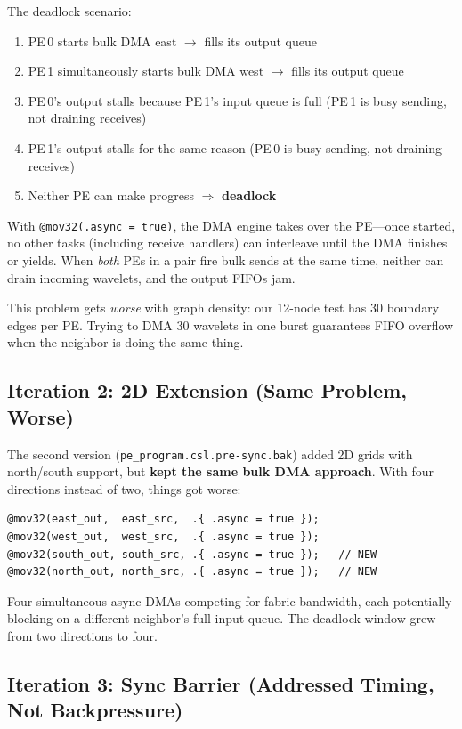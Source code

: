 \documentclass[11pt,letterpaper]{article}
\begin{document}
The deadlock scenario:
\begin{enumerate}[nosep]
  \item PE\,0 starts bulk DMA east $\to$ fills its output queue
  \item PE\,1 simultaneously starts bulk DMA west $\to$ fills its output queue
  \item PE\,0's output stalls because PE\,1's input queue is full (PE\,1 is busy sending, not draining receives)
  \item PE\,1's output stalls for the same reason (PE\,0 is busy sending, not draining receives)
  \item Neither PE can make progress $\Longrightarrow$ \textbf{deadlock}
\end{enumerate}

With \texttt{@mov32(.async = true)}, the DMA engine takes over the PE---once started, no other tasks (including receive handlers) can interleave until the DMA finishes or yields. When \emph{both} PEs in a pair fire bulk sends at the same time, neither can drain incoming wavelets, and the output FIFOs jam.

This problem gets \emph{worse} with graph density: our 12-node test has 30 boundary edges per PE. Trying to DMA 30 wavelets in one burst guarantees FIFO overflow when the neighbor is doing the same thing.

\subsection{Iteration 2: 2D Extension (Same Problem, Worse)}

The second version (\texttt{pe\_program.csl.pre-sync.bak}) added 2D grids with north/south support, but \textbf{kept the same bulk DMA approach}. With four directions instead of two, things got worse:

\begin{lstlisting}[language=CSL, numbers=none, caption={Pre-sync 2D version: still bulk DMA per direction}]
@mov32(east_out,  east_src,  .{ .async = true });
@mov32(west_out,  west_src,  .{ .async = true });
@mov32(south_out, south_src, .{ .async = true });   // NEW
@mov32(north_out, north_src, .{ .async = true });   // NEW
\end{lstlisting}

Four simultaneous async DMAs competing for fabric bandwidth, each potentially blocking on a different neighbor's full input queue. The deadlock window grew from two directions to four.

\subsection{Iteration 3: Sync Barrier (Addressed Timing, Not Backpressure)}
\end{document}
